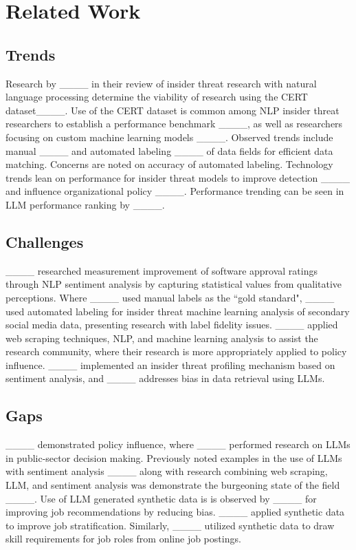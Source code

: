 \section{Related Work}
\subsection{Trends}

Research by ____ in their review of insider threat research with natural language processing determine the viability of research using the CERT dataset____. Use of the CERT dataset is common among NLP insider threat researchers to establish a performance benchmark ____, as well as researchers focusing on custom machine learning models ____. Observed trends include manual ____ and automated labeling ____ of data fields for efficient data matching. Concerns are noted on accuracy of automated labeling. Technology trends lean on performance for insider threat models to improve detection ____ and influence organizational policy ____. Performance trending can be seen in LLM performance ranking by ____.

\subsection{Challenges}

  ____ researched measurement improvement of software approval ratings through NLP sentiment analysis by capturing statistical values from qualitative perceptions. Where ____ used manual labels as the ``gold standard", ____ used automated labeling for insider threat machine learning analysis of secondary social media data, presenting research with label fidelity issues. ____ applied web scraping techniques, NLP, and machine learning analysis to assist the research community, where their research is more appropriately applied to policy influence. ____ implemented an insider threat profiling mechanism based on sentiment analysis, and ____ addresses bias in data retrieval using LLMs.
    
\subsection{Gaps}

____ demonstrated policy influence, where ____ performed research on LLMs in public-sector decision making. Previously noted examples in the use of LLMs with sentiment analysis ____ along with research combining web scraping, LLM, and sentiment analysis was demonstrate the burgeoning state of the field ____. Use of LLM generated synthetic data is is observed by ____ for improving job recommendations by reducing bias. ____ applied synthetic data to improve job stratification. Similarly, ____ utilized synthetic data to draw skill requirements for job roles from online job postings. 

